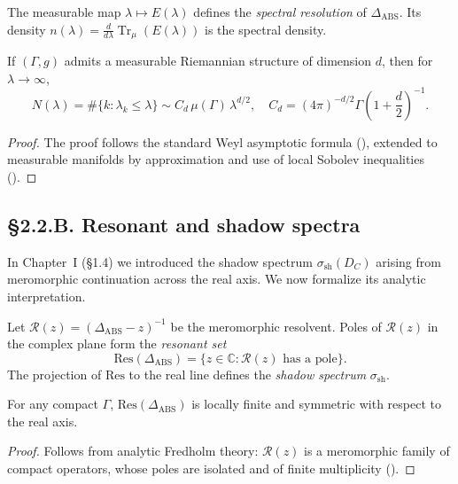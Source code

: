 \begin{definition}
The measurable map $\lambda\mapsto E(\lambda)$ defines the \emph{spectral resolution} of $\Delta_{\mathrm{ABS}}$.  
Its density $n(\lambda)=\frac{d}{d\lambda}\operatorname{Tr}_\mu(E(\lambda))$ is the spectral density.
\end{definition}

\begin{theorem}\label{thm:2.2.weyl}
If $(\Gamma,g)$ admits a measurable Riemannian structure of dimension $d$, then for $\lambda\to\infty$,
\[
N(\lambda)=\#\{k:\lambda_k\le\lambda\}
\sim 
C_d\,\mu(\Gamma)\,\lambda^{d/2},
\quad 
C_d=(4\pi)^{-d/2}\Gamma\!\left(1+\frac{d}{2}\right)^{-1}.
\]
\end{theorem}

\begin{proof}
The proof follows the standard Weyl asymptotic formula (\cite{Hormander1968}), extended to measurable manifolds by approximation and use of local Sobolev inequalities (\cite{Hebey1996}).
\end{proof}

\subsection*{§2.2.B. Resonant and shadow spectra}

In Chapter~I (§1.4) we introduced the shadow spectrum $\sigma_{\mathrm{sh}}(D_C)$ arising from meromorphic continuation across the real axis.  
We now formalize its analytic interpretation.

\begin{definition}
Let $\mathcal{R}(z)=(\Delta_{\mathrm{ABS}}-z)^{-1}$ be the meromorphic resolvent.
Poles of $\mathcal{R}(z)$ in the complex plane form the \emph{resonant set} 
\[
\mathrm{Res}(\Delta_{\mathrm{ABS}})=\{z\in\mathbb{C}:\mathcal{R}(z)\text{ has a pole}\}.
\]
The projection of $\mathrm{Res}$ to the real line defines the \emph{shadow spectrum} $\sigma_{\mathrm{sh}}$.
\end{definition}

\begin{lemma}\label{lem:2.2.resfin}
For any compact $\Gamma$, $\mathrm{Res}(\Delta_{\mathrm{ABS}})$ is locally finite and symmetric with respect to the real axis.
\end{lemma}

\begin{proof}
Follows from analytic Fredholm theory: $\mathcal{R}(z)$ is a meromorphic family of compact operators, whose poles are isolated and of finite multiplicity (\cite{GohbergKrein1969}).
\end{proof}

